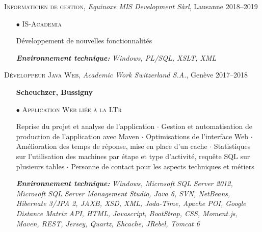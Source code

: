 \documentclass[11pt,a4paper]{moderncv}
\begin{document}
\begin{tcolorbox}[boxrule=0pt,arc=0pt,colback=lightgray]{\textsc{Informaticien de gestion}, \emph{Equinoxe MIS Development Sàrl}, Lausanne \hfill 2018--2019}
\end{tcolorbox}
\begin{itemize}

	\item[$\bullet$] \textsc{IS-Academia}
	
	\item[] Développement de nouvelles fonctionnalités

	\item[] \emph{\textbf{Environnement technique:}} \emph{Windows, PL/SQL, XSLT, XML}
	      	      	
\end{itemize}

\vspace{2cm}



\begin{tcolorbox}[boxrule=0pt,arc=0pt,colback=lightgray]{\textsc{Développeur Java Web}, \emph{Academic Work Switzerland S.A.}, Genève \hfill 2017--2018}
\end{tcolorbox}
\begin{itemize}

\item[] \textbf{Scheuchzer, Bussigny}

	\item[$\bullet$] \textsc{Application Web liée à la LTr}
	\item[] Reprise du projet et analyse de l'application $\cdot$ Gestion et automatisation de production de l'application avec Maven $\cdot$ Optimisations de l'interface Web $\cdot$ Amélioration des temps de réponse, mise en place d'un cache $\cdot$ Statistiques sur l'utilisation des machines par étape et type d'activité, requête SQL sur plusieurs tables $\cdot$ Personne de contact pour les aspects techniques et métiers

\item[] \emph{\textbf{Environnement technique:}} \emph{Windows, Microsoft SQL Server 2012, Microsoft SQL Server Management Studio, Java 6, SVN, NetBeans, Hibernate 3/JPA 2, JAXB, XSD, XML, Joda-Time, Apache POI, Google Distance Matrix API, HTML, Javascript, BootStrap, CSS, Moment.js, Maven, REST, Jersey, Quartz, Ehcache, JRebel, Tomcat 6}
	      	      	
\end{itemize}
\end{document}
